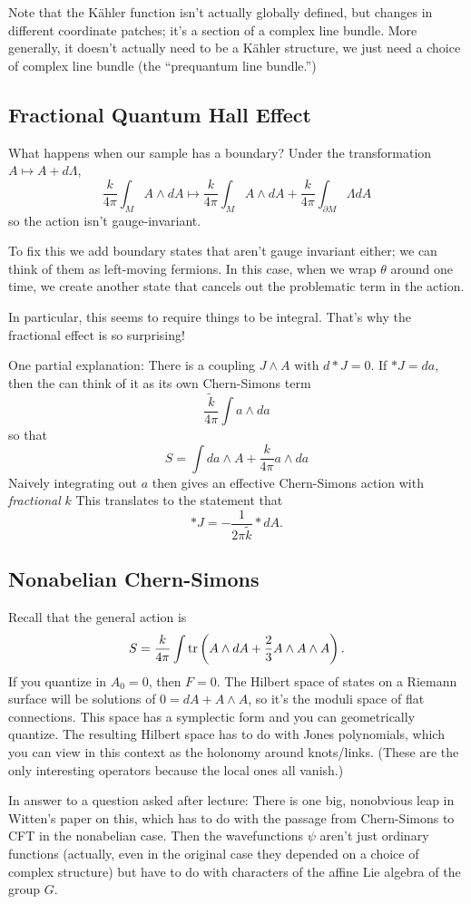 Note that the K\"ahler function isn't actually globally defined, but changes in different coordinate patches; it's a section of a complex line bundle.
More generally, it doesn't actually need to be a K\"ahler structure, we just need a choice of complex line bundle (the ``prequantum line bundle.'')

\subsection*{Fractional Quantum Hall Effect}
What happens when our sample has a boundary?
Under the transformation $A \mapsto A+ d \Lambda$, 
\[
\frac{k}{4 \pi} \int_M A \wedge dA \mapsto \frac{k}{4 \pi} \int_M A \wedge dA + \frac{k}{4 \pi} \int_{\partial M} \Lambda dA
\]
so the action isn't gauge-invariant.

To fix this we add boundary states that aren't gauge invariant either; we can think of them as left-moving fermions.
In this case, when we wrap $\theta$ around one time, we create another state that cancels out the problematic term in the action.

In particular, this seems to require things to be integral.
That's why the fractional effect is so surprising!

One partial explanation: There is a coupling $J \wedge A$ with $d*J = 0$.
If $*J = da$, then the can think of it as its own Chern-Simons term
\[
\frac{\tilde k}{4 \pi} \int a \wedge da
\]
so that
\[
S = \int da \wedge A + \frac{k}{4 \pi} a \wedge da
\]
Naively integrating out $a$ then gives an effective Chern-Simons action with \emph{fractional} $k$
This translates to the statement that
\[
*J = - \frac{1}{2 \pi \tilde k} * dA.
\]

\subsection*{Nonabelian Chern-Simons}
Recall that the general action is
\[
S = \frac{k}{4 \pi} \int \operatorname{tr}\left(A \wedge dA + \frac{2}{3} A \wedge A \wedge A \right).
\]
If you quantize in $A_0 = 0$, then $F = 0$.
The Hilbert space of states on a Riemann surface will be solutions of $0 = dA + A \wedge A$, so it's the moduli space of flat connections.
This space has a symplectic form and you can geometrically quantize.
The resulting Hilbert space has to do with Jones polynomials, which you can view in this context as the holonomy around knots/links.
(These are the only interesting operators because the local ones all vanish.)

In answer to a question asked after lecture: There is one big, nonobvious leap in Witten's paper on this, which has to do with the passage from Chern-Simons to CFT in the nonabelian case.
Then the wavefunctions $\psi$ aren't just ordinary functions (actually, even in the original case they depended on a choice of complex structure) but have to do with characters of the affine Lie algebra of the group $G$.